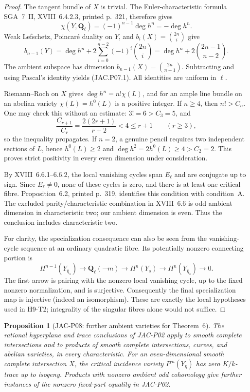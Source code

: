 \documentclass[11pt,a4paper]{article}
\newtheorem{proposition}[theorem]{Proposition}
\begin{document}
\begin{proof}
The tangent bundle of $X$ is trivial.  The Euler-characteristic
formula SGA~7~II, XVIII~6.4.2.3, printed p.~321, therefore gives
\[
 \chi(Y,\mathbf Q_\ell)=(-1)^{n-1}\deg h^n=-\deg h^n.
\]
Weak Lefschetz, Poincar\'e duality on $Y$, and
$b_i(X)=\binom{2n}{i}$ give
\[
 b_{n-1}(Y)=\deg h^n+
       2\sum_{i=0}^{n-2}(-1)^i\binom{2n}{i}
 =\deg h^n+2\binom{2n-1}{n-2}.
\]
The ambient subspace has dimension $b_{n-1}(X)=\binom{2n}{n-1}$.
Subtracting and using Pascal's identity yields (JAC.P07.1).
All identities are uniform in $\ell$.

Riemann--Roch on $X$ gives $\deg h^n=n!\chi(L)$, and for an
ample line bundle on an abelian variety $\chi(L)=h^0(L)$ is a
positive integer.  If $n\ge4$, then $n!>C_n$.  One may check this
without an estimate: $3!=6>C_3=5$, and
\[
 \frac{C_{r+1}}{C_r}=\frac{2(2r+1)}{r+2}<4\le r+1
 \qquad(r\ge3),
\]
so the inequality propagates.  If $n=2$, a genuine pencil requires
two independent sections of $L$, hence $h^0(L)\ge2$ and
$\deg h^2=2h^0(L)\ge4>C_2=2$.  This proves strict positivity
in every even dimension under consideration.

By XVIII~6.6.1--6.6.2, the local vanishing cycles span $E_\ell$
and are conjugate up to sign.  Since $E_\ell\ne0$, none of these
cycles is zero, and there is at least one critical fibre.
Proposition~6.2, printed p.~319, identifies this condition with
condition~A.  The excluded parity/characteristic combination in
XVIII~6.6 is odd ambient dimension in characteristic two; our
ambient dimension is even.  Thus the conclusion includes
characteristic two.

For clarity, the specialization consequence can also be seen from
the vanishing-cycle sequence at an ordinary quadratic fibre.
Its potentially nonzero connecting portion is
\[
 H^{n-1}(Y_{\overline\eta_s})\longrightarrow
 \mathbf Q_\ell(-m)\longrightarrow H^n(Y_s)
 \longrightarrow H^n(Y_{\overline\eta_s})\longrightarrow0.
\]
The first arrow is pairing with the nonzero local vanishing cycle,
up to the fixed nonzero normalization, and is surjective.
Consequently the final specialization map is injective (indeed an
isomorphism).  These are exactly the local hypotheses used in
H9-T2; integrality of the singular fibres alone would not suffice.
\end{proof}

\begin{proposition}[JAC-P08: further ambient varieties for Theorem~6]
\label{jac:P08}
The rational hyperplane and trace conclusions of JAC-P02 apply to
smooth complete intersections and to products of smooth complete
intersections, curves, and abelian varieties, in every characteristic.
For an even-dimensional smooth complete intersection $X$, the
critical incidence variety $P^m(Y_\eta)$ has zero $K/k$-trace up to
isogeny.  Products with nonzero ambient odd cohomology give further
instances of the nonzero fixed-part equality in JAC-P02.
\end{proposition}
\end{document}
